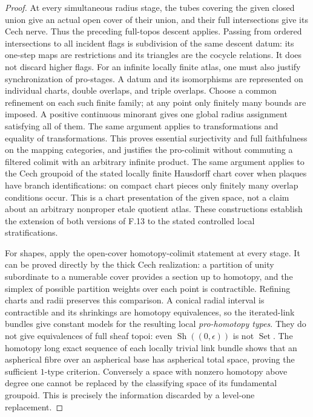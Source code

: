 \begin{proof}
At every simultaneous radius stage, the tubes covering the given
closed union give an actual open cover of their union, and their full
intersections give its Cech nerve. Thus the preceding full-topos
descent applies. Passing from ordered intersections to all incident
flags is subdivision of the same descent datum: its one-step maps
are restrictions and its triangles are the cocycle relations. It
does not discard higher flags. For an infinite locally finite atlas,
one must also justify synchronization of pro-stages. A datum and its
isomorphisms are represented on individual charts, double overlaps,
and triple overlaps. Choose a common refinement on each such finite
family; at any point only finitely many bounds are imposed. A positive
continuous minorant gives one global radius assignment satisfying
all of them. The same argument applies to transformations and equality
of transformations. This proves essential surjectivity and full
faithfulness on the mapping categories, and justifies the pro-colimit
without commuting a filtered colimit with an arbitrary infinite
product. The same argument applies to the Cech groupoid of the stated
locally finite Hausdorff chart cover when plaques have branch
identifications: on compact chart pieces only finitely many overlap
conditions occur. This is a chart presentation of the given space,
not a claim about an arbitrary nonproper etale quotient atlas.
These constructions establish the
extension of both versions of F.13 to the stated controlled local
stratifications.

For shapes, apply the open-cover homotopy-colimit statement at every
stage. It can be proved directly by the thick Cech realization: a
partition of unity subordinate to a numerable cover provides a section
up to homotopy, and the simplex of possible partition weights over
each point is contractible. Refining charts and radii preserves this
comparison. A conical radial interval is contractible and its shrinkings
are homotopy equivalences, so the iterated-link bundles give constant
models for the resulting local \emph{pro-homotopy types}. They do not
give equivalences of full sheaf topoi: even
$\operatorname{Sh}((0,\epsilon))$ is not $\operatorname{Set}$.
The homotopy long exact sequence of each locally trivial link bundle
shows that an aspherical fibre over an aspherical base has aspherical
total space, proving the sufficient $1$-type criterion. Conversely a
space with nonzero homotopy above degree one cannot be replaced by
the classifying space of its fundamental groupoid. This is precisely
the information discarded by a level-one replacement.


\end{proof}
